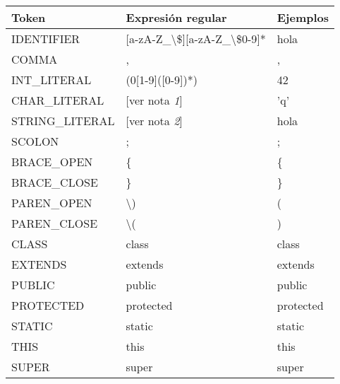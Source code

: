 \documentclass [a4paper,abstracton,titlepage]{scrartcl}
\begin{document}
 \begin{longtable}{l | l | l}

{\bfseries{}Token          } &
{\bfseries{}Expresión regular                          } &
{\bfseries{}Ejemplos}
 \tabularnewline
  \endhead


IDENTIFIER      &
[a-zA-Z\_{}\textbackslash{}\${}][a-zA-Z\_{}\textbackslash{}\${}0-9]*                  &
hola %
 \tabularnewline

COMMA           &
,                                           &
, %
 \tabularnewline

INT\_{}LITERAL     &
(0\textbar{}[1-9]([0-9])*)                          &
42 %
 \tabularnewline

CHAR\_{}LITERAL    &
[ver nota \emph{1}]                              &
'q' %
 \tabularnewline

STRING\_{}LITERAL  &
[ver nota \emph{2}]                              &
\textquotedbl{}hola\textquotedbl{} %
 \tabularnewline

SCOLON          &
;                                           &
; %
 \tabularnewline

BRACE\_{}OPEN      &
\{{}                                          &
\{{} %
 \tabularnewline

BRACE\_{}CLOSE     &
\}{}                                          &
\}{} %
 \tabularnewline

PAREN\_{}OPEN      &
\textbackslash{})                                          &
( %
 \tabularnewline

PAREN\_{}CLOSE     &
\textbackslash{}(                                          &
) %
 \tabularnewline

CLASS           &
class                                       &
class %
 \tabularnewline

EXTENDS         &
extends                                     &
extends %
 \tabularnewline

PUBLIC          &
public                                      &
public %
 \tabularnewline

PROTECTED       &
protected                                   &
protected %
 \tabularnewline

STATIC          &
static                                      &
static %
 \tabularnewline

THIS            &
this                                        &
this %
 \tabularnewline

SUPER           &
super                                       &
super %
 \tabularnewline


\end{longtable}
\end{document}
